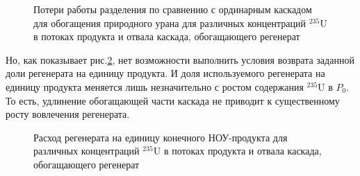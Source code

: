 \begin{figure}[ht]
  \caption{Потери работы разделения по сравнению с ординарным каскадом для обогащения природного урана для различных концентраций $^{235}$U в потоках продукта и отвала каскада, обогащающего регенерат}\label{Figure_13}
\end{figure}

Но, как показывает рис.\ref{Figure_10}, нет возможности выполнить условия возврата заданной доли регенерата на единицу продукта. И доля используемого регенерата на единицу продукта меняется лишь незначительно с ростом содержания $^{235}$U в $P_0$. То есть, удлинение  обогащающей части каскада не приводит к существенному росту вовлечения регенерата.

\begin{figure}[ht]
  \caption{Расход регенерата на единицу конечного НОУ-продукта для различных концентраций $^{235}$U в потоках продукта и отвала каскада, обогащающего регенерат}\label{Figure_10}
\end{figure}

